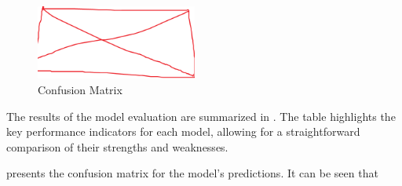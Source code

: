 \begin{figure}[h]
    \centering
    \includegraphics[width=200px]{figures/placeholder.png} %
    \centering
    \caption{Confusion Matrix} %
    \label{fig:confusion_matrix_transfer_learning_model} %
\end{figure}

The results of the model evaluation are summarized in . The table highlights the key performance indicators for each model, allowing for a straightforward comparison of their strengths and weaknesses.

 presents the confusion matrix for the model's predictions. It can be seen that 


